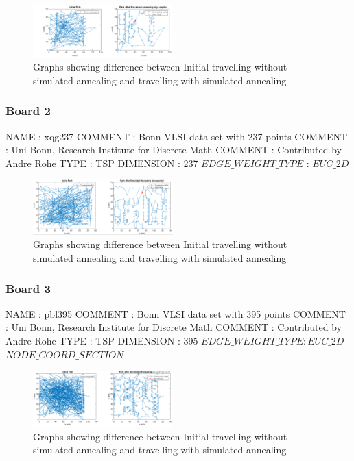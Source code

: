 \documentclass[15pt,journal]{IEEEtran}
\begin{document}
\begin{figure}[H]%
\begin {center}
\includegraphics[width=0.48\textwidth]{images/tsp36.png}
\caption{Graphs showing difference between Initial travelling without simulated annealing and travelling with simulated annealing} %
\label{fig:ecg}
\end {center}
\end{figure}


\subsubsection{\bf{Board 2}}
NAME : xqg237
COMMENT : Bonn VLSI data set with 237 points
COMMENT : Uni Bonn, Research Institute for Discrete Math
COMMENT : Contributed by Andre Rohe
TYPE : TSP
DIMENSION : 237
$EDGE\_WEIGHT\_TYPE$ : $EUC\_2D$

\begin{figure}[H]%
\begin {center}
\includegraphics[width=0.48\textwidth]{images/_b2.PNG}
\caption{Graphs showing difference between Initial travelling without simulated annealing and travelling with simulated annealing} %
\label{fig:ecg}
\end {center}
\end{figure}

\subsubsection{\bf{Board 3}}
NAME : pbl395
COMMENT : Bonn VLSI data set with 395 points
COMMENT : Uni Bonn, Research Institute for Discrete Math
COMMENT : Contributed by Andre Rohe
TYPE : TSP
DIMENSION : 395
$EDGE\_WEIGHT\_TYPE : EUC\_2D$
$NODE\_COORD\_SECTION$

\begin{figure}[H]%
\begin {center}
\includegraphics[width=0.48\textwidth]{images/_b3.PNG}
\caption{Graphs showing difference between Initial travelling without simulated annealing and travelling with simulated annealing} %
\label{fig:ecg}
\end {center}
\end{figure}
\end{document}
